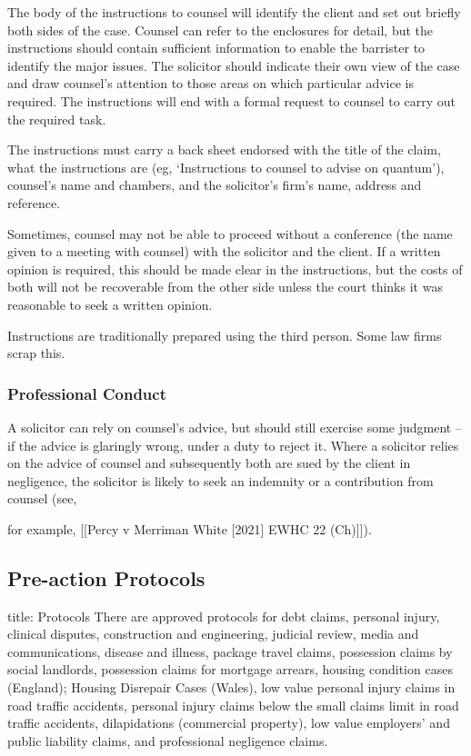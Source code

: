\documentclass[
]{article}
\newenvironment{Shaded}{}{}
\newcommand{\NormalTok}[1]{#1}
\begin{document}
The body of the instructions to counsel will identify the client and set
out briefly both sides of the case. Counsel can refer to the enclosures
for detail, but the instructions should contain sufficient information
to enable the barrister to identify the major issues. The solicitor
should indicate their own view of the case and draw counsel's attention
to those areas on which particular advice is required. The instructions
will end with a formal request to counsel to carry out the required
task.

The instructions must carry a back sheet endorsed with the title of the
claim, what the instructions are (eg, `Instructions to counsel to advise
on quantum'), counsel's name and chambers, and the solicitor's firm's
name, address and reference.

Sometimes, counsel may not be able to proceed without a conference (the
name given to a meeting with counsel) with the solicitor and the client.
If a written opinion is required, this should be made clear in the
instructions, but the costs of both will not be recoverable from the
other side unless the court thinks it was reasonable to seek a written
opinion.

Instructions are traditionally prepared using the third person. Some law
firms scrap this.

\hypertarget{professional-conduct-3}{%
\subsubsection{Professional Conduct}\label{professional-conduct-3}}

A solicitor can rely on counsel's advice, but should still exercise some
judgment -- if the advice is glaringly wrong, under a duty to reject it.
Where a solicitor relies on the advice of counsel and subsequently both
are sued by the client in negligence, the solicitor is likely to seek an
indemnity or a contribution from counsel (see,

for example, {[}{[}Percy v Merriman White {[}2021{]} EWHC 22
(Ch){]}{]}).

\hypertarget{pre-action-protocols}{%
\subsection{Pre-action Protocols}\label{pre-action-protocols}}

\begin{Shaded}
\begin{Highlighting}[]
\NormalTok{title: Protocols}
\NormalTok{There are approved protocols for debt claims, personal injury, clinical disputes, construction and engineering, judicial review, media and communications, disease and illness, package travel claims, possession claims by social landlords, possession claims for mortgage arrears, housing condition cases (England); Housing Disrepair Cases (Wales), low value personal injury claims in road traffic accidents, personal injury claims below the small claims limit in road traffic accidents, dilapidations (commercial property), low value employers’ and public liability claims, and professional negligence claims.}
\end{Highlighting}
\end{Shaded}
\end{document}
